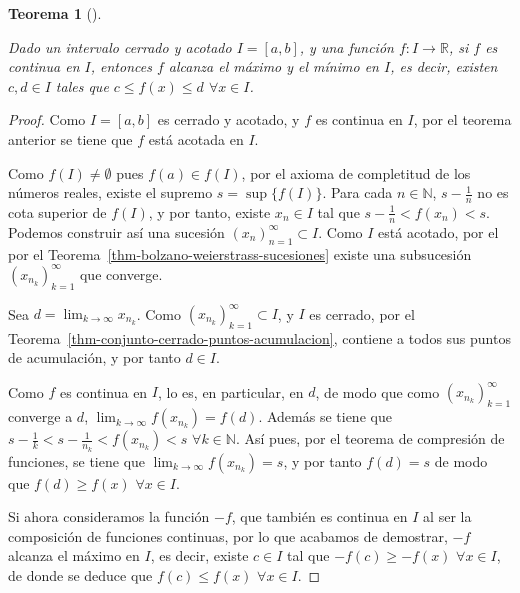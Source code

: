 \documentclass[
  a4paper,
]{scrreport}
\theoremstyle{plain}
\theoremstyle{plain}
\newtheorem{theorem}{Teorema}[chapter]
\theoremstyle{definition}
\theoremstyle{plain}
\theoremstyle{definition}
\theoremstyle{remark}
\begin{document}
\leavevmode{}%
\begin{theorem}[]\label{thm-extremos-funcion-continua-intervalo-cerrado}

Dado un intervalo cerrado y acotado \(I=[a,b]\), y una función
\(f:I\to\mathbb{R}\), si \(f\) es continua en \(I\), entonces \(f\)
alcanza el máximo y el mínimo en \(I\), es decir, existen \(c,d\in I\)
tales que \(c\leq f(x)\leq d\) \(\forall x\in I\).

\end{theorem}

\begin{tcolorbox}[enhanced jigsaw, title=\textcolor{quarto-callout-note-color}{\faInfo}\hspace{0.5em}{Demostración}, opacityback=0, titlerule=0mm, colback=white, opacitybacktitle=0.6, colbacktitle=quarto-callout-note-color!10!white, breakable, left=2mm, bottomtitle=1mm, toptitle=1mm, coltitle=black, arc=.35mm, leftrule=.75mm, toprule=.15mm, rightrule=.15mm, bottomrule=.15mm, colframe=quarto-callout-note-color-frame]

\begin{proof}

Como \(I=[a,b]\) es cerrado y acotado, y \(f\) es continua en \(I\), por
el teorema anterior se tiene que \(f\) está acotada en \(I\).

Como \(f(I)\neq \emptyset\) pues \(f(a)\in f(I)\), por el axioma de
completitud de los números reales, existe el supremo \(s=\sup\{f(I)\}\).
Para cada \(n\in\mathbb{N}\), \(s-\frac{1}{n}\) no es cota superior de
\(f(I)\), y por tanto, existe \(x_n\in I\) tal que
\(s-\frac{1}{n}<f(x_n)<s\). Podemos construir así una sucesión
\((x_n)_{n=1}^\infty\subset I\). Como \(I\) está acotado, por el por el
Teorema~\ref{thm-bolzano-weierstrass-sucesiones} existe una subsucesión
\((x_{n_k})_{k=1}^\infty\) que converge.

Sea \(d=\lim_{k\to\infty}x_{n_k}\). Como
\((x_{n_k})_{k=1}^\infty\subset I\), y \(I\) es cerrado, por el
Teorema~\ref{thm-conjunto-cerrado-puntos-acumulacion}, contiene a todos
sus puntos de acumulación, y por tanto \(d\in I\).

Como \(f\) es continua en \(I\), lo es, en particular, en \(d\), de modo
que como \((x_{n_k})_{k=1}^\infty\) converge a \(d\),
\(\lim_{k\to\infty}f(x_{n_k}) = f(d)\). Además se tiene que
\(s-\frac{1}{k}<s-\frac{1}{n_k}<f(x_{n_k})<s\)
\(\forall k\in\mathbb{N}\). Así pues, por el teorema de compresión de
funciones, se tiene que \(\lim_{k\to\infty} f(x_{n_k})=s\), y por tanto
\(f(d)=s\) de modo que \(f(d)\geq f(x)\) \(\forall x\in I\).

Si ahora consideramos la función \(-f\), que también es continua en
\(I\) al ser la composición de funciones continuas, por lo que acabamos
de demostrar, \(-f\) alcanza el máximo en \(I\), es decir, existe
\(c\in I\) tal que \(-f(c)\geq -f(x)\) \(\forall x\in I\), de donde se
deduce que \(f(c)\leq f(x)\) \(\forall x\in I\).

\end{proof}

\end{tcolorbox}
\end{document}
